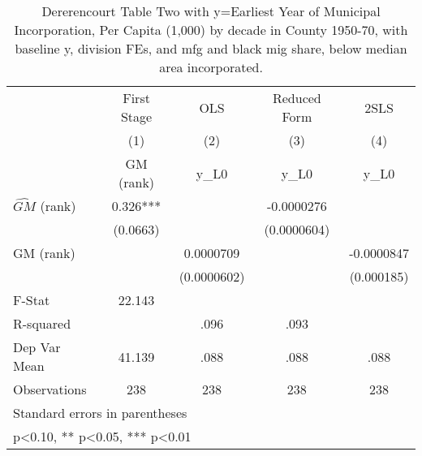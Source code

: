 \begin{table}[htbp]\centering
\def\sym#1{\ifmmode^{#1}\else\(^{#1}\)\fi}
\caption{Dererencourt Table Two with y=Earliest Year of Municipal Incorporation, Per Capita (1,000) by decade in County 1950-70, with baseline y, division FEs, and mfg and black mig share, below median area incorporated.}
\begin{tabular}{l*{4}{c}}
\toprule
                    & First Stage   &         OLS   &Reduced Form   &        2SLS   \\
                    &\multicolumn{1}{c}{(1)}&\multicolumn{1}{c}{(2)}&\multicolumn{1}{c}{(3)}&\multicolumn{1}{c}{(4)}\\
                    &\multicolumn{1}{c}{GM  (rank)}&\multicolumn{1}{c}{y\_L0}&\multicolumn{1}{c}{y\_L0}&\multicolumn{1}{c}{y\_L0}\\
\midrule
$\hat{GM}$ (rank)   &       0.326***&               &  -0.0000276   &               \\
                    &    (0.0663)   &               & (0.0000604)   &               \\
\addlinespace
GM  (rank)          &               &   0.0000709   &               &  -0.0000847   \\
                    &               & (0.0000602)   &               &  (0.000185)   \\
\midrule
F-Stat              &      22.143   &               &               &               \\
R-squared           &               &        .096   &        .093   &               \\
Dep Var Mean        &      41.139   &        .088   &        .088   &        .088   \\
Observations        &         238   &         238   &         238   &         238   \\
\bottomrule
\multicolumn{5}{l}{\footnotesize Standard errors in parentheses}\\
\multicolumn{5}{l}{\footnotesize * p<0.10, ** p<0.05, *** p<0.01}\\
\end{tabular}
\end{table}
